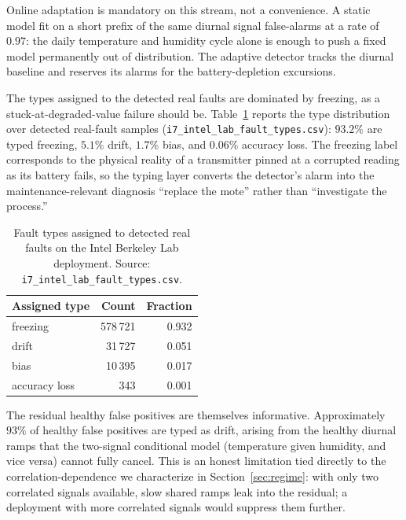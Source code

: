 Online adaptation is mandatory on this stream, not a convenience. A static model fit on a short prefix of the same diurnal signal false-alarms at a rate of $0.97$: the daily temperature and humidity cycle alone is enough to push a fixed model permanently out of distribution. The adaptive detector tracks the diurnal baseline and reserves its alarms for the battery-depletion excursions.

The types assigned to the detected real faults are dominated by freezing, as a stuck-at-degraded-value failure should be. Table~\ref{tab:realtypes} reports the type distribution over detected real-fault samples (\texttt{i7\_intel\_lab\_fault\_types.csv}): $93.2\%$ are typed freezing, $5.1\%$ drift, $1.7\%$ bias, and $0.06\%$ accuracy loss. The freezing label corresponds to the physical reality of a transmitter pinned at a corrupted reading as its battery fails, so the typing layer converts the detector's alarm into the maintenance-relevant diagnosis ``replace the mote'' rather than ``investigate the process.''

\begin{table}[t]
    \centering
    \caption{Fault types assigned to detected real faults on the Intel Berkeley Lab deployment. Source: \texttt{i7\_intel\_lab\_fault\_types.csv}.}
    \label{tab:realtypes}
    \begin{tabular}{lrr}
        \toprule
        Assigned type & Count & Fraction \\
        \midrule
        freezing      & 578\,721 & 0.932 \\
        drift         & 31\,727  & 0.051 \\
        bias          & 10\,395  & 0.017 \\
        accuracy loss & 343      & 0.001 \\
        \bottomrule
    \end{tabular}
\end{table}

The residual healthy false positives are themselves informative. Approximately $93\%$ of healthy false positives are typed as drift, arising from the healthy diurnal ramps that the two-signal conditional model (temperature given humidity, and vice versa) cannot fully cancel. This is an honest limitation tied directly to the correlation-dependence we characterize in Section~\ref{sec:regime}: with only two correlated signals available, slow shared ramps leak into the residual; a deployment with more correlated signals would suppress them further.

